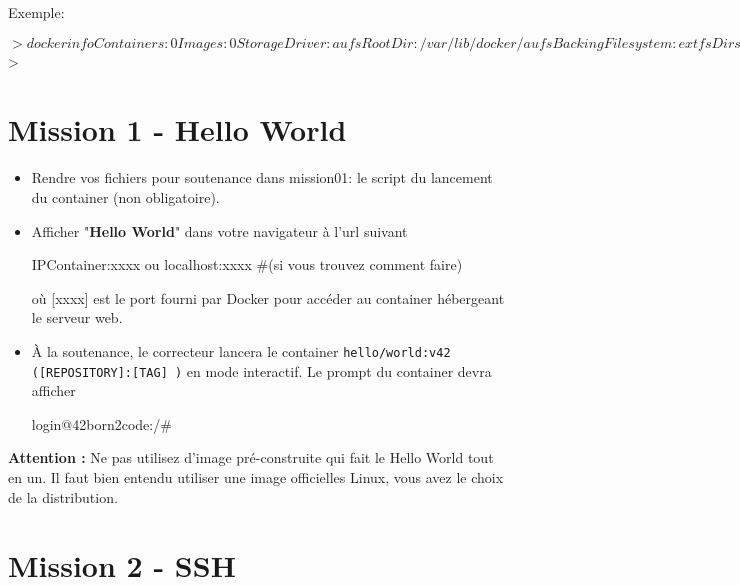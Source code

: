 \documentclass{42}
\begin{document}
Exemple:
\begin{42console}
$> docker info
Containers: 0
Images: 0
Storage Driver: aufs
 Root Dir: /var/lib/docker/aufs
 Backing Filesystem: extfs
 Dirs: 0
Execution Driver: native-0.2
Kernel Version: 3.16.0-30-generic
Operating System: Ubuntu 14.10
CPUs: 2
Total Memory: 3.633 GiB
Name: ubuntu
ID: PDDP:L64U:RQBT:G5ET:TEAC:XIJK:7JMR:ZVJW:NWU3:JMMD:YV36:WRUM
WARNING: No swap limit support
$>
\end{42console}

	\newpage

\section{Mission 1 - Hello World}

\begin{itemize}
	\item Rendre vos fichiers pour soutenance dans mission01: le script du lancement du container (non obligatoire).
	\item Afficher "\textbf{Hello World}" dans votre navigateur à l’url suivant
	\begin{42console}
		IPContainer:xxxx ou localhost:xxxx #(si vous trouvez comment faire)
	\end{42console}
	où [xxxx] est le port fourni par Docker pour accéder au container hébergeant le serveur web.
	\item À la soutenance, le correcteur lancera le container \texttt{hello/world:v42 ([REPOSITORY]:[TAG] )} en mode interactif. Le prompt du container devra afficher
	\begin{42console}
		login@42born2code:/#
	\end{42console}
\end{itemize}
\warn
{
	\textbf{Attention :} Ne pas utilisez d'image pré-construite qui fait le Hello World tout en un. Il faut bien entendu utiliser une image officielles Linux, vous avez le choix de la distribution.
}

	\newpage

\section{Mission 2 - SSH}
\end{document}
